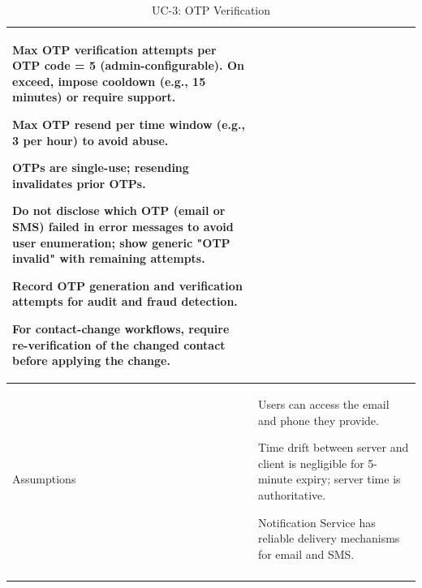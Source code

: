 \begin{longtable}{|p{3.5cm}|p{12cm}|}
Max OTP verification attempts per OTP code = 5 (admin-configurable). On exceed, impose cooldown (e.g., 15 minutes) or require support.

Max OTP resend per time window (e.g., 3 per hour) to avoid abuse.

OTPs are single-use; resending invalidates prior OTPs.

Do not disclose which OTP (email or SMS) failed in error messages to avoid user enumeration; show generic "OTP invalid" with remaining attempts.

Record OTP generation and verification attempts for audit and fraud detection.

For contact-change workflows, require re-verification of the changed contact before applying the change. \\
\hline
Assumptions &
Users can access the email and phone they provide.

Time drift between server and client is negligible for 5-minute expiry; server time is authoritative.

Notification Service has reliable delivery mechanisms for email and SMS. \\
\hline
\caption{UC-3: OTP Verification}
\end{longtable}

